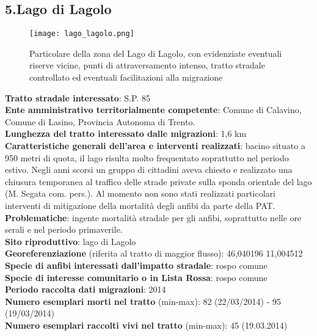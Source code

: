 \documentclass[11pt,a4paper,twoside]{memoir}
\begin{document}
\newpage
\begin{tcolorbox}[breakable,colback=white,colframe=green,width=10cm]
\subsection{5.Lago di Lagolo}
\end{tcolorbox}

\begin{figure}[H]
\label{fig:map_lagolo}
\centering
  \texttt{[image: lago\_lagolo.png]}
\caption{Particolare della zona del Lago di Lagolo, con evidenziate eventuali riserve vicine, punti di attraversamento intenso, tratto stradale controllato ed eventuali facilitazioni alla migrazione}
\end{figure}

\textbf{Tratto stradale interessato}: S.P. 85  \\
\textbf{Ente amministrativo territorialmente competente}: Comune di Calavino, Comune di Lasino, Provincia Autonoma di Trento.  \\
\textbf{Lunghezza del tratto interessato dalle migrazioni}: 1,6 km \\
\textbf{Caratteristiche generali dell’area e interventi realizzati}: bacino situato a 950 metri di quota, il lago risulta molto frequentato soprattutto nel periodo estivo. Negli anni scorsi un gruppo di cittadini aveva chiesto e realizzato una chiusura temporanea al traffico delle strade private sulla sponda orientale del lago (M. Segata com. pers.). Al momento non sono stati realizzati particolari interventi di mitigazione della mortalità degli anfibi da parte della PAT. \\
\textbf{Problematiche}: ingente mortalità stradale per gli anfibi, soprattutto nelle ore serali e nel periodo primaverile.  \\
\textbf{Sito riproduttivo}: lago di Lagolo \\
\textbf{Georeferenziazione} (riferita al tratto di maggior flusso): 46,040196 11,004512 \\
\textbf{Specie di anfibi interessati dall’impatto stradale}: rospo comune \\
\textbf{Specie di interesse comunitario o in Lista Rossa}: rospo comune \\
\textbf{Periodo raccolta dati migrazioni}: 2014 \\
\textbf{Numero esemplari morti nel tratto} (min-max): 82 (22/03/2014) - 95 (19/03/2014) \\
\textbf{Numero esemplari raccolti vivi nel tratto} (min-max): 45 (19.03.2014) \\
\end{document}
